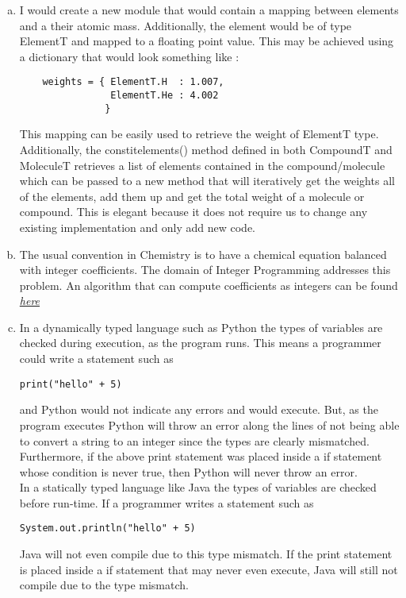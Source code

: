 \documentclass[12pt]{article}
\begin{document}
\begin{enumerate}[a)]
\item I would create a new module that would contain a mapping between elements and a their atomic mass. Additionally, the element would be of type ElementT and mapped to a floating point value. This may be achieved using a dictionary that would look something like :
\begin{verbatim}
	weights = { ElementT.H  : 1.007,
				ElementT.He : 4.002
			   }
\end{verbatim}

This mapping can be easily used to retrieve the weight of ElementT type. Additionally, the constit\textunderscore elements() method defined in both CompoundT and MoleculeT retrieves a list of elements contained in the compound/molecule which can be passed to a new method that will iteratively get the weights all of the elements, add them up and get the total weight of a molecule or compound. This is elegant because it does not require us to change any existing implementation and only add new code.

\item The usual convention in Chemistry is to have a chemical equation balanced with integer coefficients. The domain of Integer Programming addresses this problem. An algorithm that can compute coefficients as integers can be found \emph{\href{https://www.sciencedirect.com/science/article/pii/S0895717706000367}{here}}

\item In a dynamically typed language such as Python the types of variables are checked during execution, as the program runs. This means a programmer could write a statement such as \begin{verbatim}
print("hello" + 5)
\end{verbatim} and Python would not indicate any errors and would execute. But, as the program executes Python will throw an error along the lines of not being able to convert a string to an integer since the types are clearly mismatched. Furthermore, if the above print statement was placed inside a if statement whose condition is never true, then Python will never throw an error.\\

In a statically typed language like Java the types of variables are checked before run-time. If a programmer writes a statement such as \begin{verbatim}
System.out.println("hello" + 5)
\end{verbatim} Java will not even compile due to this type mismatch. If the print statement is placed inside a if statement that may never even execute, Java will still not compile due to the type mismatch.\\


\end{enumerate}
\end{document}
